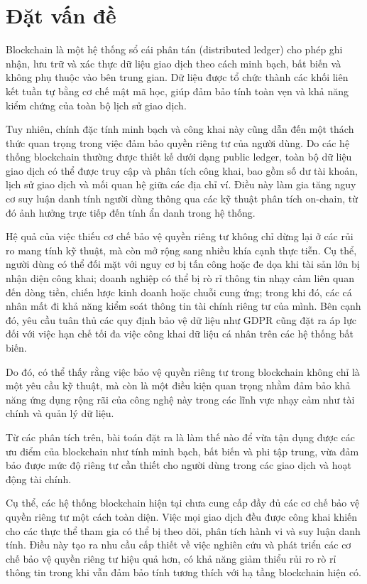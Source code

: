 \documentclass[../DoAn.tex]{subfiles}
\begin{document}
\section{Đặt vấn đề}
\label{section:1.1}
Blockchain là một hệ thống sổ cái phân tán (distributed ledger) cho phép ghi nhận, lưu trữ và xác thực dữ liệu giao dịch theo cách minh bạch, bất biến và không phụ thuộc vào bên trung gian. Dữ liệu được tổ chức thành các khối liên kết tuần tự bằng cơ chế mật mã học, giúp đảm bảo tính toàn vẹn và khả năng kiểm chứng của toàn bộ lịch sử giao dịch.

Tuy nhiên, chính đặc tính minh bạch và công khai này cũng dẫn đến một thách thức quan trọng trong việc đảm bảo quyền riêng tư của người dùng. Do các hệ thống blockchain thường được thiết kế dưới dạng public ledger, toàn bộ dữ liệu giao dịch có thể được truy cập và phân tích công khai, bao gồm số dư tài khoản, lịch sử giao dịch và mối quan hệ giữa các địa chỉ ví. Điều này làm gia tăng nguy cơ suy luận danh tính người dùng thông qua các kỹ thuật phân tích on-chain, từ đó ảnh hưởng trực tiếp đến tính ẩn danh trong hệ thống.

Hệ quả của việc thiếu cơ chế bảo vệ quyền riêng tư không chỉ dừng lại ở các rủi ro mang tính kỹ thuật, mà còn mở rộng sang nhiều khía cạnh thực tiễn. Cụ thể, người dùng có thể đối mặt với nguy cơ bị tấn công hoặc đe dọa khi tài sản lớn bị nhận diện công khai; doanh nghiệp có thể bị rò rỉ thông tin nhạy cảm liên quan đến dòng tiền, chiến lược kinh doanh hoặc chuỗi cung ứng; trong khi đó, các cá nhân mất đi khả năng kiểm soát thông tin tài chính riêng tư của mình. Bên cạnh đó, yêu cầu tuân thủ các quy định bảo vệ dữ liệu như GDPR cũng đặt ra áp lực đối với việc hạn chế tối đa việc công khai dữ liệu cá nhân trên các hệ thống bất biến.

Do đó, có thể thấy rằng việc bảo vệ quyền riêng tư trong blockchain không chỉ là một yêu cầu kỹ thuật, mà còn là một điều kiện quan trọng nhằm đảm bảo khả năng ứng dụng rộng rãi của công nghệ này trong các lĩnh vực nhạy cảm như tài chính và quản lý dữ liệu.

Từ các phân tích trên, bài toán đặt ra là làm thế nào để vừa tận dụng được các ưu điểm của blockchain như tính minh bạch, bất biến và phi tập trung, vừa đảm bảo được mức độ riêng tư cần thiết cho người dùng trong các giao dịch và hoạt động tài chính.

Cụ thể, các hệ thống blockchain hiện tại chưa cung cấp đầy đủ các cơ chế bảo vệ quyền riêng tư một cách toàn diện. Việc mọi giao dịch đều được công khai khiến cho các thực thể tham gia có thể bị theo dõi, phân tích hành vi và suy luận danh tính. Điều này tạo ra nhu cầu cấp thiết về việc nghiên cứu và phát triển các cơ chế bảo vệ quyền riêng tư hiệu quả hơn, có khả năng giảm thiểu rủi ro rò rỉ thông tin trong khi vẫn đảm bảo tính tương thích với hạ tầng blockchain hiện có.
\end{document}
